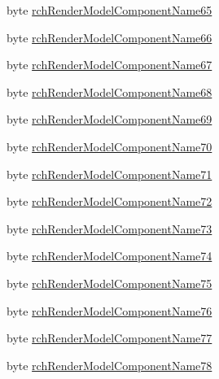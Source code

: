 \begin{DoxyCompactItemize}
\item 
byte \mbox{\hyperlink{struct_valve_1_1_v_r_1_1_input_origin_info__t_a4f7cb9291178575dc8b9709e06ffba01}{rch\+Render\+Model\+Component\+Name65}}
\item 
byte \mbox{\hyperlink{struct_valve_1_1_v_r_1_1_input_origin_info__t_acf949be9a7b5d6ecf2b38f6cc360020f}{rch\+Render\+Model\+Component\+Name66}}
\item 
byte \mbox{\hyperlink{struct_valve_1_1_v_r_1_1_input_origin_info__t_ab813471f7c26823d1872785d3bef4e64}{rch\+Render\+Model\+Component\+Name67}}
\item 
byte \mbox{\hyperlink{struct_valve_1_1_v_r_1_1_input_origin_info__t_af9d97b12a17ec624ed0262a04b314742}{rch\+Render\+Model\+Component\+Name68}}
\item 
byte \mbox{\hyperlink{struct_valve_1_1_v_r_1_1_input_origin_info__t_af5f519fd8c2e9da01f8b445cdf2d1efa}{rch\+Render\+Model\+Component\+Name69}}
\item 
byte \mbox{\hyperlink{struct_valve_1_1_v_r_1_1_input_origin_info__t_a2116d8ea2a5dcabce032109f50ef5629}{rch\+Render\+Model\+Component\+Name70}}
\item 
byte \mbox{\hyperlink{struct_valve_1_1_v_r_1_1_input_origin_info__t_a5314af8a8327af1efb2b43cf7b85751a}{rch\+Render\+Model\+Component\+Name71}}
\item 
byte \mbox{\hyperlink{struct_valve_1_1_v_r_1_1_input_origin_info__t_a2a6ffaf4907866c8346a394386bf4297}{rch\+Render\+Model\+Component\+Name72}}
\item 
byte \mbox{\hyperlink{struct_valve_1_1_v_r_1_1_input_origin_info__t_a533372a1284b145e85185781b27e30fc}{rch\+Render\+Model\+Component\+Name73}}
\item 
byte \mbox{\hyperlink{struct_valve_1_1_v_r_1_1_input_origin_info__t_a41369b7525864a72a199c86699eb77eb}{rch\+Render\+Model\+Component\+Name74}}
\item 
byte \mbox{\hyperlink{struct_valve_1_1_v_r_1_1_input_origin_info__t_ac3a2fca2ca444595e3ec7c944f3a58eb}{rch\+Render\+Model\+Component\+Name75}}
\item 
byte \mbox{\hyperlink{struct_valve_1_1_v_r_1_1_input_origin_info__t_aa43d62275f62c7cd136d67f7d598d7c7}{rch\+Render\+Model\+Component\+Name76}}
\item 
byte \mbox{\hyperlink{struct_valve_1_1_v_r_1_1_input_origin_info__t_a4df9f803fd4810cd2ca21174214293b4}{rch\+Render\+Model\+Component\+Name77}}
\item 
byte \mbox{\hyperlink{struct_valve_1_1_v_r_1_1_input_origin_info__t_a7506bf6ad67b44df9d94fa495d7ae3f8}{rch\+Render\+Model\+Component\+Name78}}

\end{DoxyCompactItemize}
